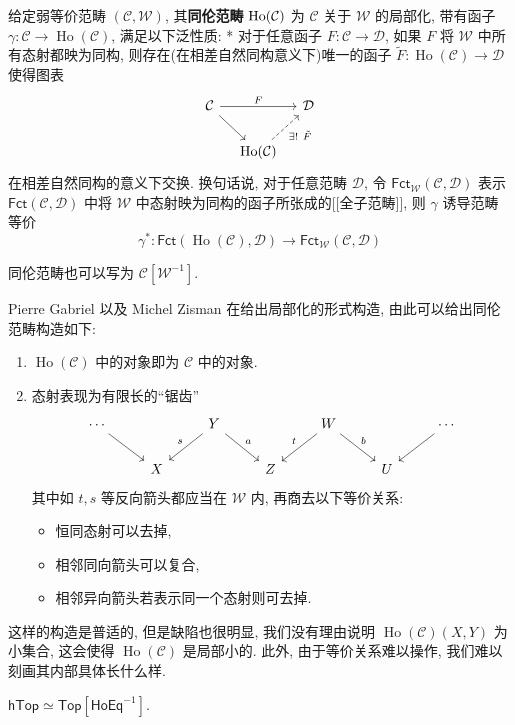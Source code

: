 \begin{definition}[同伦范畴]
    给定弱等价范畴 $(\mathcal{C},\mathcal{W})$, 其\textbf{同伦范畴} $\operatorname{Ho}(\cal{C})$ 
    为 $\mathcal{C}$ 关于 $\mathcal{W}$ 的局部化, 带有函子 $\gamma \colon \mathcal{C} \to \operatorname{Ho}(\mathcal{C})$,
    满足以下泛性质:
    * 对于任意函子 $F\colon \mathcal{C} \to \mathcal{D}$, 如果 $F$ 将 $\mathcal{W}$ 中所有态射都映为同构,
    则存在(在相差自然同构意义下)唯一的函子 $\tilde{F} \colon \operatorname{Ho}(\mathcal{C}) \to \mathcal{D}$
    使得图表
    \[ \begin{tikzcd}[column sep=10pt]
                \mathcal{C} \ar[rr,"F"]\ar[dr] & & \mathcal{D}\\
                & \operatorname{Ho}(\mathcal{C}) \ar[ur,dashed,"\exists!\ \tilde F"']
    \end{tikzcd} \]
    在相差自然同构的意义下交换.
    换句话说, 对于任意范畴 $\mathcal{D}$, 令 $\mathsf{Fct}_{\mathcal{W}}(\mathcal{C},\mathcal{D})$ 
    表示 $\mathsf{Fct}(\mathcal{C},\mathcal{D})$ 中将 $\mathcal{W}$ 中态射映为同构的函子所张成的[[全子范畴]], 则
    $\gamma$ 诱导范畴等价
    \[
        \gamma^* \colon \mathsf{Fct}(\operatorname{Ho}(\mathcal{C}),\mathcal{D}) \to\mathsf{Fct}_{\mathcal{W}}(\mathcal{C},\mathcal{D})
    \]
\end{definition}
\begin{remark}
    同伦范畴也可以写为 $\mathcal{C}[\mathcal{W}^{-1}]$.
\end{remark}
Pierre Gabriel 以及 Michel Zisman 在\cite[1.1]{Gabriel-Zisman67}给出局部化的形式构造, 由此可以给出同伦范畴构造如下:
\begin{enumerate}
    \item $\operatorname{Ho}(\mathcal{C})$ 中的对象即为 $\mathcal{C}$ 中的对象.
    \item 态射表现为有限长的``锯齿''
    \[\begin{tikzcd}
	\cdots && Y && W && \cdots \\
	& X && Z && U
	\arrow[from=1-1, to=2-2]
	\arrow["s"', from=1-3, to=2-2]
	\arrow["a", from=1-3, to=2-4]
	\arrow["t"', from=1-5, to=2-4]
	\arrow["b", from=1-5, to=2-6]
	\arrow[from=1-7, to=2-6]
    \end{tikzcd}\]
    其中如 $t,s$ 等反向箭头都应当在 $\mathcal{W}$ 内, 再商去以下等价关系:
    \begin{itemize}
        \item 恒同态射可以去掉,
        \item 相邻同向箭头可以复合,
        \item 相邻异向箭头若表示同一个态射则可去掉.
    \end{itemize}
\end{enumerate}
这样的构造是普适的, 但是缺陷也很明显, 我们没有理由说明 $\operatorname{Ho}(\mathcal{C})(X,Y)$ 为小集合,
这会使得 $\operatorname{Ho}(\mathcal{C})$ 是局部小的. 此外, 由于等价关系难以操作, 我们难以刻画其内部具体长什么样.
\begin{proposition} \label{thm-1-htop}
    $\mathsf{hTop}\simeq\mathsf{Top}[\mathsf{HoEq}^{-1}]$.
\end{proposition}

